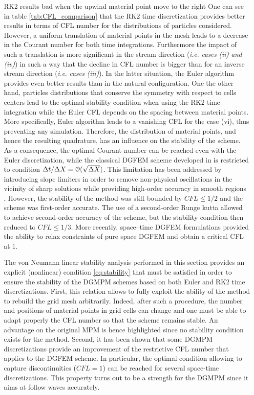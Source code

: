RK2 results bad when the upwind material point move to the right
One can see in table \ref{tab:CFL_comparison} that the RK2 time discretization provides better results in terms of CFL number for the distributions of particles considered. However, a uniform translation of material points in the mesh leads to a decrease in the Courant number for both time integrations. Furthermore the impact of such a translation is more significant in the stream direction (\textit{i.e. cases (ii) and (iv)}) in such a way that the decline in CFL number is bigger than for an inverse stream direction (\textit{i.e. cases (iii)}). In the latter situation, the Euler algorithm provides even better results than in the natural configuration. One the other hand, particles distributions that conserve the symmetry with respect to cells centers lead to the optimal stability condition when using the RK2 time integration while the Euler CFL depends on the spacing between material points. More specifically, Euler algorithm leads to a vanishing CFL for the case (vi), thus preventing any simulation. Therefore, the distribution of material points, and hence the resulting quadrature, has an influence on the stability of the scheme. As a consequence, the optimal Courant number can be reached even with the Euler discretization, while the classical DGFEM scheme developed in \cite{Chavent_Salzano} is restricted to condition $\Delta t / \Delta X = \mathcal{O}(\sqrt{\Delta X})$. This limitation has been addressed by introducing slope limiters in order to remove non-physical oscillations in the vicinity of sharp solutions while providing high-order accuracy in smooth regions \cite{Chavent_Cockburn}. However, the stability of the method was still bounded by $CFL\leq 1/2$ and the scheme was first-order accurate. The use of a second-order Runge kutta \cite{DGFEM_CFL} allowed to achieve second-order accuracy of the scheme, but the stability condition then reduced to $CFL\leq1/3$. More recently, space–time DGFEM formulations \cite{ST_DGFEM1,ST_DGFEM2} provided the ability to relax constraints of pure space DGFEM and obtain a critical CFL at 1.

The von Neumann linear stability analysis performed in this section provides an explicit (nonlinear) condition \eqref{eq:stability} that must be satisfied in order to ensure the stability of the DGMPM schemes based on both Euler and RK2 time discretizations. First, this relation allows to fully exploit the ability of the method to rebuild the grid mesh arbitrarily. Indeed, after such a procedure, the number and positions of material points in grid cells can change and one must be able to adapt properly the CFL number so that the scheme remains stable. An advantage on the original MPM is hence highlighted since no stability condition exists for the method. Second, it has been shown that some DGMPM discretizations provide an improvement of the restrictive CFL number that applies to the DGFEM scheme. In particular, the optimal condition allowing to capture discontinuities ($CFL=1$) can be reached for several space-time discretizations. This property turns out to be a strength for the DGMPM since it aims at follow waves accurately.

